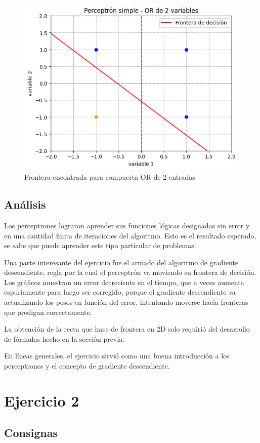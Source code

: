 \documentclass[11pt]{article} %
\begin{document}
\begin{figure}[h!]
	\centering
	\includegraphics[width=0.7\linewidth]{../imgs/ej1/ORFRONT}
	\caption[]{Frontera encontrada para compuerta OR de 2 entradas}
	\label{fig:orfront}
\end{figure}


\subsection{Análisis}

Los perceptrones lograron aprender sus funciones lógicas designadas sin error y en una cantidad finita de iteraciones del algoritmo. Esto es el resultado esperado, se sabe que puede aprender este tipo particular de problemas.

Una parte interesante del ejercicio fue el armado del algoritmo de gradiente descendiente, regla por la cual el perceptrón va moviendo su frontera de decisión. Los gráficos muestran un error decreciente en el tiempo, que a veces aumenta espuriamente para luego ser corregido, porque el gradiente descendiente va actualizando los pesos en función del error, intentando moverse hacia fronteras que predigan correctamente.

La obtención de la recta que hace de frontera en 2D solo requirió del desarrollo de fórmulas hecho en la sección previa.

En líneas generales, el ejercicio sirvió como una buena introducción a los perceptrones y el concepto de gradiente descendiente.


\clearpage

\section{Ejercicio 2}

\subsection{Consignas}
\end{document}
